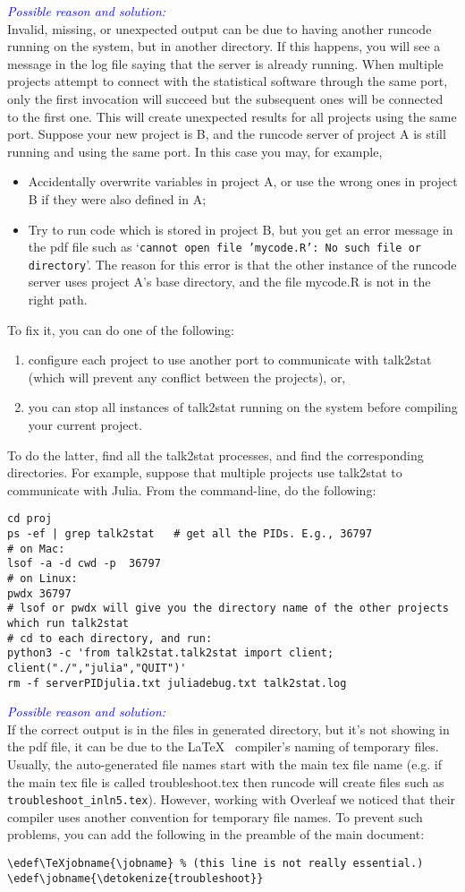 \documentclass[a4paper,10pt]{article}
\newcommand{\cause}[1] {\noindent\textit{\textcolor{blue}{Possible reason and solution:}}\\#1}
\begin{document}
\cause\bgroup
Invalid, missing, or unexpected output can be due to having another runcode running on the system, but in another directory. If this happens, you will see a message in the log file saying that the server is already running. When multiple projects attempt to connect with the statistical software through the same port, only the first invocation will succeed but the subsequent ones will be connected to  the first one. This will create unexpected results for all projects using the same port. Suppose your new project is B, and the runcode server of project A is still running and using the same port. In this case you may, for example,
\begin{itemize}
\item Accidentally overwrite variables in project A, or use the wrong ones in project B if they were also defined in A;
\item Try to run code which is stored in project B, but you get an error message in the pdf file such as `\texttt{cannot open file 'mycode.R': No such file or directory}'.   The reason for this error is that the other instance of the runcode server uses project A's base directory, and the file mycode.R is not in the right path.
\end{itemize}
To fix it, you can do one of the following:
\begin{enumerate}
\item configure each project to use another port to communicate with talk2stat (which will prevent any conflict between the projects), or,
\item you can stop all instances of talk2stat running on the system before compiling your current project.
\end{enumerate}
To do the latter, find all the talk2stat processes, and find the corresponding directories. For example, suppose that multiple projects use talk2stat to communicate with Julia. From the command-line, do the following:
\begin{Verbatim}
cd proj
ps -ef | grep talk2stat   # get all the PIDs. E.g., 36797
# on Mac:
lsof -a -d cwd -p  36797
# on Linux:
pwdx 36797
# lsof or pwdx will give you the directory name of the other projects which run talk2stat
# cd to each directory, and run:
python3 -c 'from talk2stat.talk2stat import client; client("./","julia","QUIT")'
rm -f serverPIDjulia.txt juliadebug.txt talk2stat.log
\end{Verbatim}
\egroup


\cause\bgroup
If the correct output is in the files in generated directory, but it's not showing in the pdf file, it can be due to the \LaTeX~ compiler's naming of temporary files. Usually, the auto-generated file names start with the main tex file name (e.g. if the main tex file is called troubleshoot.tex then runcode will create files such as \verb|troubleshoot_inln5.tex|). However, working with Overleaf we noticed that their compiler uses another convention for temporary file names. To prevent such problems, you can add the following in the preamble of the main document:
\begin{Verbatim}
\edef\TeXjobname{\jobname} % (this line is not really essential.)
\edef\jobname{\detokenize{troubleshoot}}
\end{Verbatim}
\egroup
\end{document}
